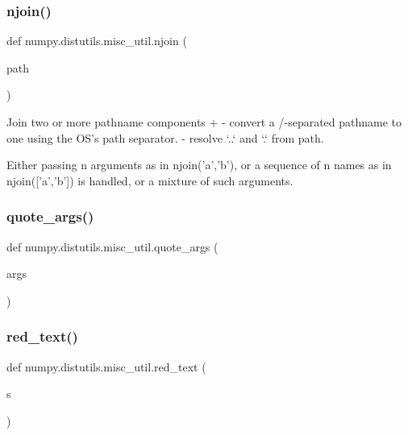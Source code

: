 \subsubsection{\texorpdfstring{njoin()}{njoin()}}
{\footnotesize\ttfamily def numpy.\+distutils.\+misc\+\_\+util.\+njoin (\begin{DoxyParamCaption}\item[{}]{path }\end{DoxyParamCaption})}

\begin{DoxyVerb}Join two or more pathname components +
- convert a /-separated pathname to one using the OS's path separator.
- resolve `..` and `.` from path.

Either passing n arguments as in njoin('a','b'), or a sequence
of n names as in njoin(['a','b']) is handled, or a mixture of such arguments.
\end{DoxyVerb}
 \mbox{\label{namespacenumpy_1_1distutils_1_1misc__util_a22e7f7be44dcf1fc77957f9300fb3675}} 
\subsubsection{\texorpdfstring{quote\+\_\+args()}{quote\_args()}}
{\footnotesize\ttfamily def numpy.\+distutils.\+misc\+\_\+util.\+quote\+\_\+args (\begin{DoxyParamCaption}\item[{}]{args }\end{DoxyParamCaption})}

\mbox{\label{namespacenumpy_1_1distutils_1_1misc__util_a8680d8d2a417b564777817ac12e84c8b}} 
\subsubsection{\texorpdfstring{red\+\_\+text()}{red\_text()}}
{\footnotesize\ttfamily def numpy.\+distutils.\+misc\+\_\+util.\+red\+\_\+text (\begin{DoxyParamCaption}\item[{}]{s }\end{DoxyParamCaption})}

